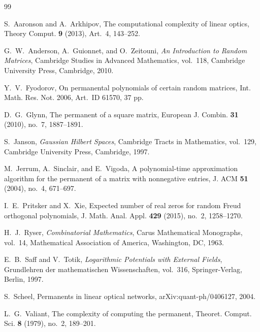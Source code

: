 \documentclass[11pt,reqno]{amsart}
\numberwithin{equation}{section}
\theoremstyle{definition}
\theoremstyle{remark}
\newcommand{\1}{\mathbf 1}
\begin{document}
\begin{thebibliography}{99}

S.~Aaronson and A.~Arkhipov,
The computational complexity of linear optics,
Theory Comput. \textbf{9} (2013), Art.~4, 143--252.

G.~W.~Anderson, A.~Guionnet, and O.~Zeitouni,
\emph{An Introduction to Random Matrices},
Cambridge Studies in Advanced Mathematics, vol.~118,
Cambridge University Press, Cambridge, 2010.

Y.~V.~Fyodorov,
On permanental polynomials of certain random matrices,
Int. Math. Res. Not. 2006, Art.~ID 61570, 37 pp.

D.~G.~Glynn,
The permanent of a square matrix,
European J. Combin. \textbf{31} (2010), no.~7, 1887--1891.

S.~Janson,
\emph{Gaussian Hilbert Spaces},
Cambridge Tracts in Mathematics, vol.~129,
Cambridge University Press, Cambridge, 1997.

M.~Jerrum, A.~Sinclair, and E.~Vigoda,
A polynomial-time approximation algorithm for the permanent of a matrix with
nonnegative entries,
J. ACM \textbf{51} (2004), no.~4, 671--697.

I.~E.~Pritsker and X.~Xie,
Expected number of real zeros for random Freud orthogonal polynomials,
J. Math. Anal. Appl. \textbf{429} (2015), no.~2, 1258--1270.

H.~J.~Ryser,
\emph{Combinatorial Mathematics},
Carus Mathematical Monographs, vol.~14,
Mathematical Association of America, Washington, DC, 1963.

E.~B.~Saff and V.~Totik,
\emph{Logarithmic Potentials with External Fields},
Grundlehren der mathematischen Wissenschaften, vol.~316,
Springer-Verlag, Berlin, 1997.

S.~Scheel,
Permanents in linear optical networks,
arXiv:quant-ph/0406127, 2004.

L.~G.~Valiant,
The complexity of computing the permanent,
Theoret. Comput. Sci. \textbf{8} (1979), no.~2, 189--201.

\end{thebibliography}
\end{document}
